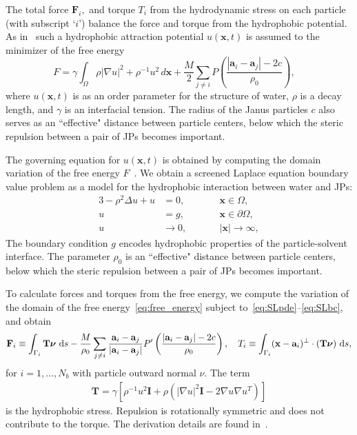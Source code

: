 \documentclass[prb,preprint,showpacs,preprintnumbers,amsmath,amssymb,longbibliography]{revtex4-1}
\renewcommand{\aa}{\mathbf{a}}
\newcommand{\bd}{\partial}
\newcommand{\FF}{\mathbf{F}}
\newcommand{\nnu}{\boldsymbol{\nu}}
\newcommand{\xx}{\mathbf{x}}
\begin{document}
The total force $\FF_i,$ and torque $T_i$ from the hydrodynamic
stress on each particle (with subscript `$i$') balance the force and
torque from the hydrophobic potential. 
As in~\citet{Fu2022_JFM} such a hydrophobic attraction potential
$u(\xx,t)$ is assumed to the minimizer of the free energy
\begin{equation}
\label{eq:free_energy}
F = \gamma
\int_{\Omega} \rho |\nabla u|^2 + \rho^{-1} u^2
\,d\xx
+ \frac{M}{2}
\sum_{j \neq i} 
P\left(\frac{|\aa_i - \aa_j|-2c}{\rho_0}\right), \quad
\end{equation}
where $u(\xx,t)$ is as an order parameter for the structure of water,
$\rho$ is a decay length, and $\gamma$ is an interfacial tension.  The
radius of the Janus particles $c$ also serves as an ``effective"
distance between particle centers, below which the steric repulsion
between a pair of JPs becomes important.

The governing equation for $u(\xx,t)$ is obtained by computing the
domain variation of the free energy $F$~\cite{Fu20}. We obtain a
screened Laplace equation boundary value problem as a model for the
hydrophobic interaction between water and JPs:
\begin{alignat}{3}
  \label{eq:SLpde}
  -\rho^2 \Delta u + u &= 0,\qquad &&\xx \in \Omega, \\
  \label{eq:SLbc}
  u &= g, &&\xx \in \bd\Omega, \\
  \label{eq:SLfarfield}
  u &\rightarrow 0, &&|\xx| \rightarrow \infty,
\end{alignat}
The boundary condition $g$ encodes hydrophobic properties of the
particle-solvent interface. The parameter $\rho_0$ is an ``effective"
distance between particle centers, below which the steric repulsion
between a pair of JPs becomes important.


To calculate forces and torques from the free energy, we compute the
variation of the domain of the free energy~\eqref{eq:free_energy}
subject to~\eqref{eq:SLpde}--\eqref{eq:SLbc}, and obtain 
\begin{equation}
  \FF_i \equiv \int_{\Gamma_i} \mathbf{T}\nnu \, \dif s
  - \frac{M}{\rho_0}
  \sum_{j \neq i}
  \frac{\aa_i - \aa_j}{|\aa_i - \aa_j|}
P'\left(\frac{|\aa_i - \aa_j|-2c}{\rho_0}\right)
  ,\quad
T_i \equiv \int_{\Gamma_i} (\xx - \aa_i)^{\perp}\cdot (\mathbf{T}\nnu) \, \dif s, 
\end{equation}
for $i = 1,\dots,N_b$ with particle outward normal $\nu$. The term 
\begin{align}
\mathbf{T}
= \gamma \left[ \rho^{-1} u^2 \mathbf{I}
  + \rho \left(|\nabla u|^2 \mathbf{I} - 2\nabla u \nabla u^T\right)\right]
\end{align}
is the hydrophobic stress. Repulsion is rotationally symmetric and does
not contribute to the torque. The derivation details are found
in~\citet{Fu20}.
\end{document}
